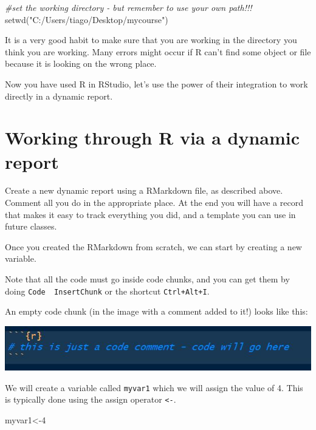 \documentclass[
]{article}
\newenvironment{Shaded}{\begin{snugshade}}{\end{snugshade}}
\newcommand{\CommentTok}[1]{\textcolor[rgb]{0.56,0.35,0.01}{\textit{#1}}}
\newcommand{\DecValTok}[1]{\textcolor[rgb]{0.00,0.00,0.81}{#1}}
\newcommand{\FunctionTok}[1]{\textcolor[rgb]{0.00,0.00,0.00}{#1}}
\newcommand{\NormalTok}[1]{#1}
\newcommand{\OtherTok}[1]{\textcolor[rgb]{0.56,0.35,0.01}{#1}}
\newcommand{\StringTok}[1]{\textcolor[rgb]{0.31,0.60,0.02}{#1}}
\begin{document}
\begin{Shaded}
\begin{Highlighting}[]
\CommentTok{\#set the working directory {-} but remember to use your own path!!!}
\FunctionTok{setwd}\NormalTok{(}\StringTok{"C:/Users/tiago/Desktop/mycourse"}\NormalTok{)}
\end{Highlighting}
\end{Shaded}

It is a very good habit to make sure that you are working in the
directory you think you are working. Many errors might occur if R can't
find some object or file because it is looking on the wrong place.

Now you have used R in RStudio, let's use the power of their integration
to work directly in a dynamic report.

\hypertarget{working-through-r-via-a-dynamic-report}{%
\section{Working through R via a dynamic
report}\label{working-through-r-via-a-dynamic-report}}

Create a new dynamic report using a RMarkdown file, as described above.
Comment all you do in the appropriate place. At the end you will have a
record that makes it easy to track everything you did, and a template
you can use in future classes.

Once you created the RMarkdown from scratch, we can start by creating a
new variable.

Note that all the code must go inside code chunks, and you can get them
by doing \texttt{Code\ \textbar{}\ InsertChunk} or the shortcut
\texttt{Ctrl+Alt+I}.

An empty code chunk (in the image with a comment added to it!) looks
like this:

\includegraphics{codechunk.JPG}

We will create a variable called \texttt{myvar1} which we will assign
the value of 4. This is typically done using the assign operator
\texttt{\textless{}-}.

\begin{Shaded}
\begin{Highlighting}[]
\NormalTok{myvar1}\OtherTok{\textless{}{-}}\DecValTok{4}
\end{Highlighting}
\end{Shaded}
\end{document}
